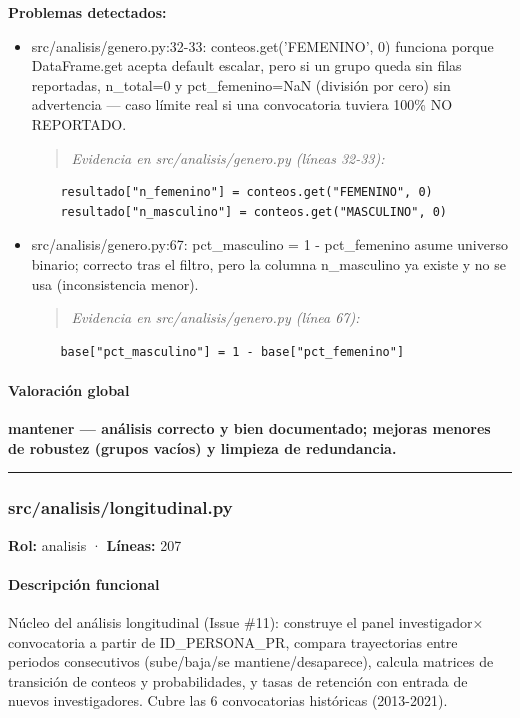 \begin{tcolorbox}[riesgo]
\textbf{Problemas detectados:}
\begin{itemize}
  \item src/analisis/genero.py:32-33: conteos.get('FEMENINO', 0) funciona porque DataFrame.get acepta default escalar, pero si un grupo queda sin filas reportadas, n\_total=0 y pct\_femenino=NaN (división por cero) sin advertencia --- caso límite real si una convocatoria tuviera 100\% NO REPORTADO.
\begin{quote}\footnotesize\ttfamily
\noindent\emph{Evidencia en src/analisis/genero.py (líneas 32-33):}
\end{quote}
\begin{lstlisting}
    resultado["n_femenino"] = conteos.get("FEMENINO", 0)
    resultado["n_masculino"] = conteos.get("MASCULINO", 0)
\end{lstlisting}

  \item src/analisis/genero.py:67: pct\_masculino = 1 - pct\_femenino asume universo binario; correcto tras el filtro, pero la columna n\_masculino ya existe y no se usa (inconsistencia menor).
\begin{quote}\footnotesize\ttfamily
\noindent\emph{Evidencia en src/analisis/genero.py (línea 67):}
\end{quote}
\begin{lstlisting}
    base["pct_masculino"] = 1 - base["pct_femenino"]
\end{lstlisting}

\end{itemize}
\end{tcolorbox}

\paragraph{Valoración global}
\textbf{mantener --- análisis correcto y bien documentado; mejoras menores de robustez (grupos vacíos) y limpieza de redundancia.}

\medskip
\hrule

\subsubsection{src/analisis/longitudinal.py}
\textbf{Rol:} analisis · \textbf{Líneas:} 207

\paragraph{Descripción funcional}
Núcleo del análisis longitudinal (Issue \#11): construye el panel investigador$\times$convocatoria a partir de ID\_PERSONA\_PR, compara trayectorias entre periodos consecutivos (sube/baja/se mantiene/desaparece), calcula matrices de transición de conteos y probabilidades, y tasas de retención con entrada de nuevos investigadores. Cubre las 6 convocatorias históricas (2013-2021).

